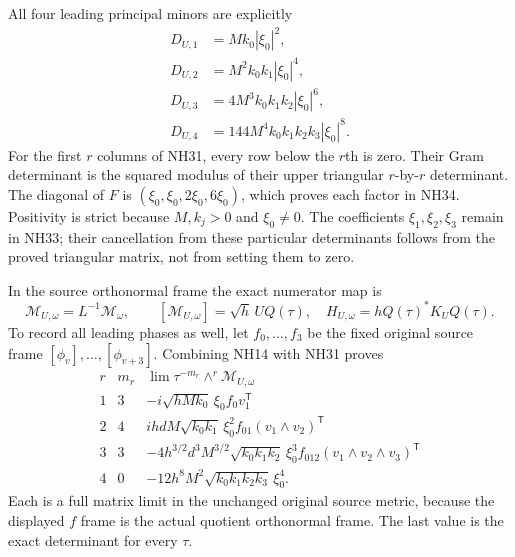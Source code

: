 All four leading principal minors are explicitly
\[
\begin{aligned}
 D_{U,1}&=Mk_0|\xi_0|^2,\\
 D_{U,2}&=M^2k_0k_1|\xi_0|^4,\\
 D_{U,3}&=4M^3k_0k_1k_2|\xi_0|^6,\\
 D_{U,4}&=144M^4k_0k_1k_2k_3|\xi_0|^8.
\end{aligned}\tag{NH34}
\]
For the first $r$ columns of NH31, every row below the
$r$th is zero. Their Gram determinant is the squared
modulus of their upper triangular $r$-by-$r$ determinant.
The diagonal of $F$ is $(\xi_0,\xi_0,2\xi_0,6\xi_0)$,
which proves each factor in NH34. Positivity is strict
because $M,k_j>0$ and $\xi_0\ne0$. The coefficients
$\xi_1,\xi_2,\xi_3$ remain in NH33; their cancellation
from these particular determinants follows from the proved
triangular matrix, not from setting them to zero.

In the source orthonormal frame the exact numerator map is
\[
 \mathcal M_{U,\omega}=L^{-1}\mathcal M_\omega,
 \qquad [\mathcal M_{U,\omega}]=\sqrt h\,UQ(\tau),
 \quad H_{U,\omega}=hQ(\tau)^*K_UQ(\tau).
 \tag{NH35}
\]
To record all leading phases as well, let $f_0,\ldots,f_3$
be the fixed original source frame $[\phi_v],\ldots,
[\phi_{v+3}]$. Combining NH14 with NH31 proves
\[
\begin{array}{c|c|c}
 r&m_r&\lim\tau^{-m_r}\wedge^r\mathcal M_{U,\omega}\\\hline
 1&3&-i\sqrt{hMk_0}\,\xi_0 f_0v_1^{\mathsf T}\\
 2&4&ihdM\sqrt{k_0k_1}\,\xi_0^2
                           f_{01}(v_1\wedge v_2)^{\mathsf T}\\
 3&3&-4h^{3/2}d^3M^{3/2}\sqrt{k_0k_1k_2}\,\xi_0^3
                           f_{012}(v_1\wedge v_2\wedge v_3)^{\mathsf T}\\
 4&0&-12h^8M^2\sqrt{k_0k_1k_2k_3}\,\xi_0^4.
\end{array}\tag{NH36}
\]
Each is a full matrix limit in the unchanged original
source metric, because the displayed $f$ frame is the
actual quotient orthonormal frame. The last value is the
exact determinant for every $\tau$.

